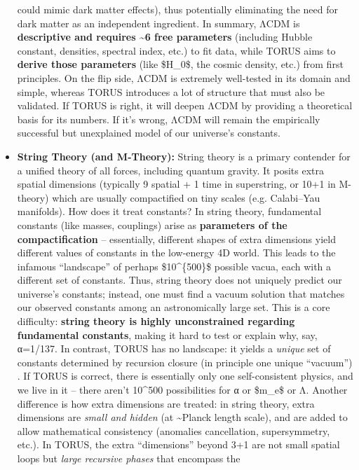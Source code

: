 \documentclass[]{article}
\begin{document}
\begin{itemize}
  could mimic dark matter effects), thus potentially eliminating the
  need for dark matter as an independent ingredient. In summary, ΛCDM is
  \textbf{descriptive and requires \textasciitilde{}6 free parameters}
  (including Hubble constant, densities, spectral index, etc.) to fit
  data, while TORUS aims to \textbf{derive those parameters} (like
  \$H\_0\$, the cosmic density, etc.) from first principles. On the flip
  side, ΛCDM is extremely well-tested in its domain and simple, whereas
  TORUS introduces a lot of structure that must also be validated. If
  TORUS is right, it will deepen ΛCDM by providing a theoretical basis
  for its numbers. If it's wrong, ΛCDM will remain the empirically
  successful but unexplained model of our universe's constants.
\item
  \textbf{String Theory (and M-Theory):} String theory is a primary
  contender for a unified theory of all forces, including quantum
  gravity. It posits extra spatial dimensions (typically 9 spatial + 1
  time in superstring, or 10+1 in M-theory) which are usually
  compactified on tiny scales (e.g. Calabi--Yau manifolds). How does it
  treat constants? In string theory, fundamental constants (like masses,
  couplings) arise as \textbf{parameters of the compactification} --
  essentially, different shapes of extra dimensions yield different
  values of constants in the low-energy 4D world. This leads to the
  infamous ``landscape'' of perhaps \$10\^{}\{500\}\$ possible vacua,
  each with a different set of constants. Thus, string theory does not
  uniquely predict our universe's constants; instead, one must find a
  vacuum solution that matches our observed constants among an
  astronomically large set. This is a core difficulty: \textbf{string
  theory is highly unconstrained regarding fundamental constants},
  making it hard to test or explain why, say, α=1/137. In contrast,
  TORUS has no landscape: it yields a \emph{unique} set of constants
  determined by recursion closure (in principle one unique ``vacuum'')​.
  If TORUS is correct, there is essentially only one self-consistent
  physics, and we live in it -- there aren't 10\^{}500 possibilities for
  α or \$m\_e\$ or Λ. Another difference is how extra dimensions are
  treated: in string theory, extra dimensions are \emph{small and
  hidden} (at \textasciitilde{}Planck length scale), and are added to
  allow mathematical consistency (anomalies cancellation, supersymmetry,
  etc.). In TORUS, the extra ``dimensions'' beyond 3+1 are not small
  spatial loops but \emph{large recursive phases} that encompass the

\end{itemize}
\end{document}
